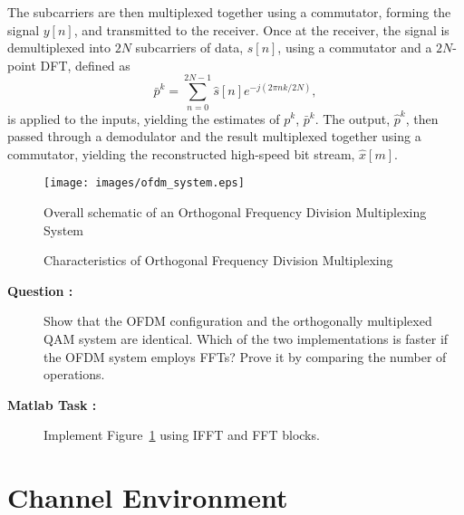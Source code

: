 \documentclass[12pt]{article}
\newcommand{\goodgap}{%
\hspace{\subfigtopskip}%
\hspace{\subfigbottomskip}}
\newcounter{questioncnt}
\newcounter{matlabcnt}
\begin{document}
The subcarriers are then multiplexed together using a commutator,
forming the signal $y[n]$, and transmitted to the receiver. Once
at the receiver, the signal is demultiplexed into $2N$ subcarriers
of data, $\hat{s}[n]$, using a commutator and a $2N$-point DFT,
defined as
\begin{equation}
\bar{p}^k=\sum\limits_{n=0}^{2N-1}\hat{s}[n]e^{-j(2\pi{nk}/2N)},
\end{equation}
is applied to the inputs, yielding the estimates of $p^k$,
$\bar{p}^k$. The output, $\hat{p}^k$, then passed through a
demodulator and the result multiplexed together using a
commutator, yielding the reconstructed high-speed bit stream,
$\hat{x}[m]$.
\begin{figure}[h]
\centering
\texttt{[image: images/ofdm\_system.eps]}\\
\caption{Overall schematic of an Orthogonal Frequency Division
Multiplexing System}\label{ofdmsys}
\end{figure}


\begin{figure}[h]
\begin{center}
\goodgap
{}
\caption{Characteristics of Orthogonal Frequency Division
Multiplexing}
\end{center}
\end{figure}

\begin{description}
    \item[{\bf Question :}]
    Show that the OFDM configuration and the orthogonally
    multiplexed QAM system are identical. Which of the two
    implementations is faster if the OFDM system employs FFTs?
    Prove it by comparing the number of operations.
\end{description}

\begin{description}
    \item[{\bf Matlab Task :}]
    Implement Figure~\ref{ofdmsys} using IFFT and FFT blocks.
\end{description}



\section{Channel Environment}
\end{document}
